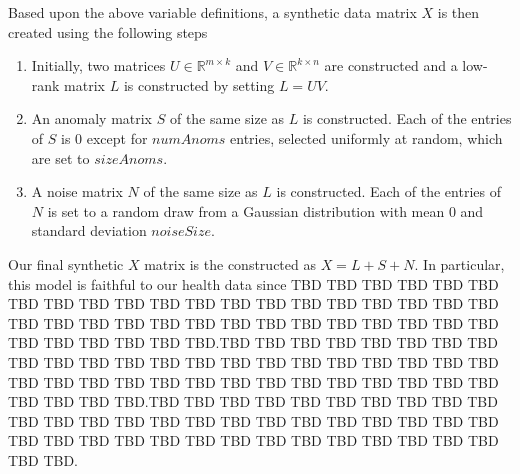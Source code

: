 \documentclass[conference]{IEEEtran}
\begin{document}
Based upon the above variable definitions, a synthetic data matrix $X$ is then created using the following steps
\begin{enumerate}
\item Initially, two matrices $U \in \mathbb{R}^{m \times k}$ and $V \in \mathbb{R}^{k \times n}$ are constructed and a low-rank matrix $L$ is constructed by setting $L = UV$.
\item An anomaly matrix $S$ of the same size as $L$ is constructed.  Each of the entries of $S$ is $0$ except for $numAnoms$ entries, selected uniformly at random, which are set to $sizeAnoms$.
\item A noise matrix $N$ of the same size as $L$ is constructed. Each of the entries of $N$ is set to a random draw from a Gaussian distribution with mean $0$ and standard deviation $noiseSize$.
\end{enumerate}
\noindent Our final synthetic $X$ matrix is the constructed as $X=L+S+N$.  In particular, this model is faithful to our health data since TBD TBD TBD TBD TBD TBD TBD TBD TBD TBD TBD TBD TBD TBD TBD TBD TBD TBD TBD TBD TBD TBD TBD TBD TBD TBD TBD TBD TBD TBD TBD TBD TBD TBD TBD TBD TBD TBD TBD TBD.TBD TBD TBD TBD TBD TBD TBD TBD TBD TBD TBD TBD TBD TBD TBD TBD TBD TBD TBD TBD TBD TBD TBD TBD TBD TBD TBD TBD TBD TBD TBD TBD TBD TBD TBD TBD TBD TBD TBD TBD.TBD TBD TBD TBD TBD TBD TBD TBD TBD TBD TBD TBD TBD TBD TBD TBD TBD TBD TBD TBD TBD TBD TBD TBD TBD TBD TBD TBD TBD TBD TBD TBD TBD TBD TBD TBD TBD TBD TBD TBD.
\end{document}
